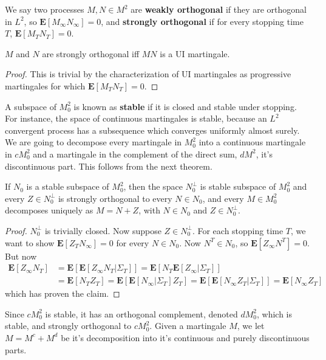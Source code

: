 We say two processes $M,N \in M^2$ are {\bf weakly orthogonal} if they are orthogonal in $L^2$, so $\mathbf{E}[M_\infty N_\infty] = 0$, and {\bf strongly orthogonal} if for every stopping time $T$, $\mathbf{E}[M_T N_T] = 0$.

\begin{lemma}
    $M$ and $N$ are strongly orthogonal iff $MN$ is a UI martingale.
\end{lemma}
\begin{proof}
    This is trivial by the characterization of UI martingales as progressive martingales for which $\mathbf{E}[M_T N_T] = 0$.
\end{proof}

A subspace of $M^2_0$ is known as {\bf stable} if it is closed and stable under stopping. For instance, the space of continuous martingales is stable, because an $L^2$ convergent process has a subsequence which converges uniformly almost surely. We are going to decompose every martingale in $M^2_0$ into a continuous martingale in $cM^2_0$ and a martingale in the complement of the direct sum, $dM^2$, it's discontinuous part. This follows from the next theorem.

\begin{theorem}
    If $N_0$ is a stable subspace of $M^2_0$, then the space $N_0^\perp$ is stable subspace of $M^2_0$ and every $Z \in N_0^\perp$ is strongly orthogonal to every $N \in N_0$, and every $M \in M_0^2$ decomposes uniquely as $M = N + Z$, with $N \in N_0$ and $Z \in N_0^\perp$.
\end{theorem}
\begin{proof}
    $N_0^\perp$ is trivially closed. Now suppose $Z \in N_0^\perp$. For each stopping time $T$, we want to show $\mathbf{E}[Z_T N_\infty] = 0$ for every $N \in N_0$. Now $N^T \in N_0$, so $\mathbf{E}[Z_\infty N^T] = 0$. But now
    \begin{align*}
        \mathbf{E}[Z_\infty N_T] &= \mathbf{E}[\mathbf{E}[Z_\infty N_T|\Sigma_T]] = \mathbf{E}[N_T \mathbf{E}[Z_\infty | \Sigma_T]]\\
        &= \mathbf{E}[N_TZ_T] = \mathbf{E}[\mathbf{E}[N_\infty | \Sigma_T] Z_T] = \mathbf{E}[\mathbf{E}[N_\infty Z_T | \Sigma_T]] = \mathbf{E}[N_\infty Z_T]
    \end{align*}
    which has proven the claim.
\end{proof}

Since $cM^2_0$ is stable, it has an orthogonal complement, denoted $dM^2_0$, which is stable, and strongly orthogonal to $cM^2_0$. Given a martingale $M$, we let $M = M^c + M^d$ be it's decomposition into it's continuous and purely discontinuous parts.

